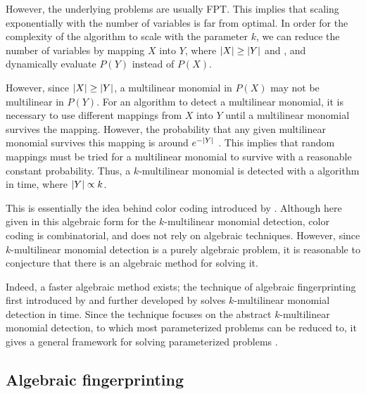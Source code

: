 However, the underlying problems are usually FPT. This implies that scaling exponentially 
with the number of variables is far from optimal. In order for the complexity of the algorithm to scale 
with the parameter $k$, we can reduce the number of variables by mapping $X$ into $Y$, where 
${\left\vert X\right\vert} \geq {\left\vert Y\right\vert}$ and
, and dynamically evaluate $P(Y)$ instead of
$P(X)$. 

However, since ${\left\vert X\right\vert} \geq {\left\vert Y\right\vert}$, a multilinear monomial in $P(X)$ may not be multilinear in $P(Y)$. 
For an algorithm to detect a multilinear monomial, it is necessary to use different mappings 
from $X$ into $Y$ until a multilinear monomial survives the mapping. However, the probability 
that any given multilinear monomial survives this mapping is around $e^{-{\left\vert Y\right\vert}}$ \cite{KouWil15}.
This implies that  random mappings must be tried for a
multilinear monomial to survive with a reasonable constant probability. Thus, a
$k$-multilinear monomial is detected with a 
 algorithm in  time, where ${\left\vert Y\right\vert} \propto k$.

This is essentially the idea behind color coding introduced by \citeauthor{Alon95} \cite{Alon95}. 
Although here given in this algebraic form for the $k$-multilinear monomial detection, 
color coding is combinatorial, and does not rely on algebraic techniques. 
However, since $k$-multilinear monomial detection is a purely algebraic problem, it is reasonable to 
conjecture that there is an algebraic method for solving it.

Indeed, a faster algebraic method exists; the technique of algebraic fingerprinting 
first introduced by \citeauthor{Koutis08} \cite{Koutis08} and 
further developed by \citeauthor{Williams09} \cite{Williams09} 
solves $k$-multilinear monomial detection in  time. 
Since the technique focuses on the abstract $k$-multilinear monomial detection, to which 
most parameterized problems can be reduced to, it gives a general framework for 
solving parameterized problems \cite{KouWil15}.

\subsection{Algebraic fingerprinting}


